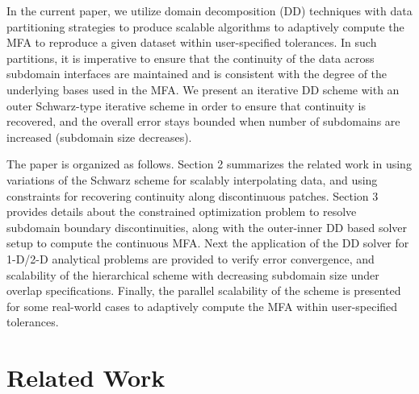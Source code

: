 \documentclass[conference]{IEEEtran}
\begin{document}
In the current paper, we utilize domain decomposition (DD) techniques \cite{smith-ddm} with data partitioning strategies to produce scalable algorithms to adaptively compute the MFA to reproduce a given dataset within user-specified tolerances. In such partitions, it is imperative to ensure that the continuity of the data across subdomain interfaces are maintained and is consistent with the degree of the underlying bases used in the MFA. 
We present an iterative DD scheme with an outer Schwarz-type iterative scheme in order to ensure that continuity is recovered, and the overall error stays bounded when number of subdomains are increased (subdomain size decreases).



The paper is organized as follows. Section 2 summarizes the related work in using variations of the Schwarz scheme for scalably interpolating data, and using constraints for recovering continuity along discontinuous patches. Section 3 provides details about the constrained optimization problem to resolve subdomain boundary discontinuities, along with the outer-inner DD based solver setup to compute the continuous MFA. Next the application of the DD solver for 1-D/2-D analytical problems are provided to verify error convergence, and scalability of the hierarchical scheme with decreasing subdomain size under overlap specifications. Finally, the parallel scalability of the scheme is presented for some real-world cases to adaptively compute the MFA within user-specified tolerances.


\section{Related Work}
\end{document}
